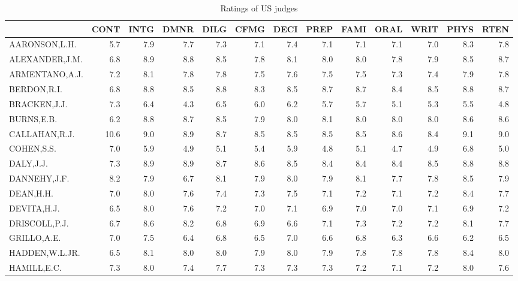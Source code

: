 \documentclass[]{article}
\begin{document}
\begin{table}

\caption{\label{tab:view}Ratings of US judges}
\centering
\fontsize{6.5}{8.5}\selectfont
\begin{tabular}[t]{lrrrrrrrrrrrr}
\toprule
  & CONT & INTG & DMNR & DILG & CFMG & DECI & PREP & FAMI & ORAL & WRIT & PHYS & RTEN\\
\midrule
\rowcolor{gray!6}  AARONSON,L.H. & 5.7 & 7.9 & 7.7 & 7.3 & 7.1 & 7.4 & 7.1 & 7.1 & 7.1 & 7.0 & 8.3 & 7.8\\
ALEXANDER,J.M. & 6.8 & 8.9 & 8.8 & 8.5 & 7.8 & 8.1 & 8.0 & 8.0 & 7.8 & 7.9 & 8.5 & 8.7\\
\rowcolor{gray!6}  ARMENTANO,A.J. & 7.2 & 8.1 & 7.8 & 7.8 & 7.5 & 7.6 & 7.5 & 7.5 & 7.3 & 7.4 & 7.9 & 7.8\\
BERDON,R.I. & 6.8 & 8.8 & 8.5 & 8.8 & 8.3 & 8.5 & 8.7 & 8.7 & 8.4 & 8.5 & 8.8 & 8.7\\
\rowcolor{gray!6}  BRACKEN,J.J. & 7.3 & 6.4 & 4.3 & 6.5 & 6.0 & 6.2 & 5.7 & 5.7 & 5.1 & 5.3 & 5.5 & 4.8\\
\addlinespace
BURNS,E.B. & 6.2 & 8.8 & 8.7 & 8.5 & 7.9 & 8.0 & 8.1 & 8.0 & 8.0 & 8.0 & 8.6 & 8.6\\
\rowcolor{gray!6}  CALLAHAN,R.J. & 10.6 & 9.0 & 8.9 & 8.7 & 8.5 & 8.5 & 8.5 & 8.5 & 8.6 & 8.4 & 9.1 & 9.0\\
COHEN,S.S. & 7.0 & 5.9 & 4.9 & 5.1 & 5.4 & 5.9 & 4.8 & 5.1 & 4.7 & 4.9 & 6.8 & 5.0\\
\rowcolor{gray!6}  DALY,J.J. & 7.3 & 8.9 & 8.9 & 8.7 & 8.6 & 8.5 & 8.4 & 8.4 & 8.4 & 8.5 & 8.8 & 8.8\\
DANNEHY,J.F. & 8.2 & 7.9 & 6.7 & 8.1 & 7.9 & 8.0 & 7.9 & 8.1 & 7.7 & 7.8 & 8.5 & 7.9\\
\addlinespace
\rowcolor{gray!6}  DEAN,H.H. & 7.0 & 8.0 & 7.6 & 7.4 & 7.3 & 7.5 & 7.1 & 7.2 & 7.1 & 7.2 & 8.4 & 7.7\\
DEVITA,H.J. & 6.5 & 8.0 & 7.6 & 7.2 & 7.0 & 7.1 & 6.9 & 7.0 & 7.0 & 7.1 & 6.9 & 7.2\\
\rowcolor{gray!6}  DRISCOLL,P.J. & 6.7 & 8.6 & 8.2 & 6.8 & 6.9 & 6.6 & 7.1 & 7.3 & 7.2 & 7.2 & 8.1 & 7.7\\
GRILLO,A.E. & 7.0 & 7.5 & 6.4 & 6.8 & 6.5 & 7.0 & 6.6 & 6.8 & 6.3 & 6.6 & 6.2 & 6.5\\
\rowcolor{gray!6}  HADDEN,W.L.JR. & 6.5 & 8.1 & 8.0 & 8.0 & 7.9 & 8.0 & 7.9 & 7.8 & 7.8 & 7.8 & 8.4 & 8.0\\
\addlinespace
HAMILL,E.C. & 7.3 & 8.0 & 7.4 & 7.7 & 7.3 & 7.3 & 7.3 & 7.2 & 7.1 & 7.2 & 8.0 & 7.6\\

\end{tabular}
\end{table}
\end{document}
